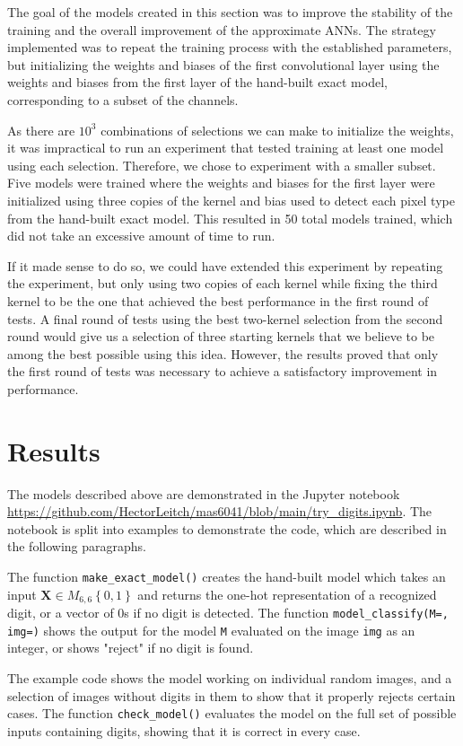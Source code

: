 \documentclass{somasmsc}
\begin{document}
The goal of the models created in this section was to improve the stability of the training and the overall improvement of the approximate ANNs. The strategy implemented was to repeat the training process with the established parameters, but initializing the weights and biases of the first convolutional layer using the weights and biases from the first layer of the hand-built exact model, corresponding to a subset of the channels.

As there are $10^3$ combinations of selections we can make to initialize the weights, it was impractical to run an experiment that tested training at least one model using each selection. Therefore, we chose to experiment with a smaller subset. Five models were trained where the weights and biases for the first layer were initialized using three copies of the kernel and bias used to detect each pixel type from the hand-built exact model. This resulted in 50 total models trained, which did not take an excessive amount of time to run.

If it made sense to do so, we could have extended this experiment by repeating the experiment, but only using two copies of each kernel while fixing the third kernel to be the one that achieved the best performance in the first round of tests. A final round of tests using the best two-kernel selection from the second round would give us a selection of three starting kernels that we believe to be among the best possible using this idea. However, the results proved that only the first round of tests was necessary to achieve a satisfactory improvement in performance.

\section{Results}

The models described above are demonstrated in the Jupyter notebook \url{https://github.com/HectorLeitch/mas6041/blob/main/try_digits.ipynb}. The notebook is split into examples to demonstrate the code, which are described in the following paragraphs.

\begin{exa}
The function \verb|make_exact_model()| creates the hand-built model which takes an input $\mathbf{X} \in M_{6,6}\left\{0,1\right\}$ and returns the one-hot representation of a recognized digit, or a vector of 0s if no digit is detected. The function \verb|model_classify(M=, img=)| shows the output for the model \verb|M| evaluated on the image \verb|img| as an integer, or shows "reject" if no digit is found.

The example code shows the model working on individual random images, and a selection of images without digits in them to show that it properly rejects certain cases. The function \verb|check_model()| evaluates the model on the full set of possible inputs containing digits, showing that it is correct in every case.
\end{exa}
\end{document}
